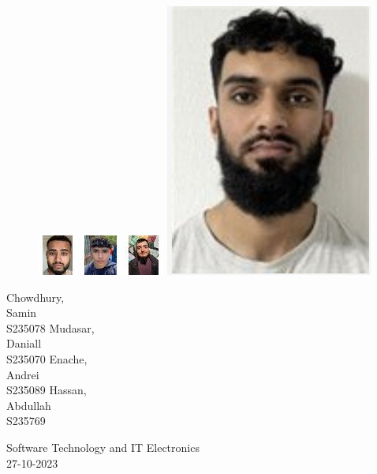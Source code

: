 \documentclass{article}
\begin{document}
\begin{figure} [H]
    \includegraphics[width=.20\textwidth]{Samin.png}\hfill
    \includegraphics[width=.20\textwidth]{Daniall.png}\hfill
    \includegraphics[width=.20\textwidth]{Andrei.png}\hfill
    \includegraphics[width=.20\textwidth]{Abdullah.png}
\end{figure}
\begin{multicols}{4}
Chowdhury, \\
Samin \\
S235078
\vfill\null
\columnbreak
Mudasar, \\
Daniall \\
S235070
\vfill\null
\columnbreak
Enache, \\
Andrei \\
S235089
\vfill\null
\columnbreak
Hassan, \\
Abdullah \\
S235769
\vfill\null
\end{multicols}

\begin{center}
    \Large{Software Technology and IT Electronics} \\
    \Large{27-10-2023}
\end{center}
\end{document}
